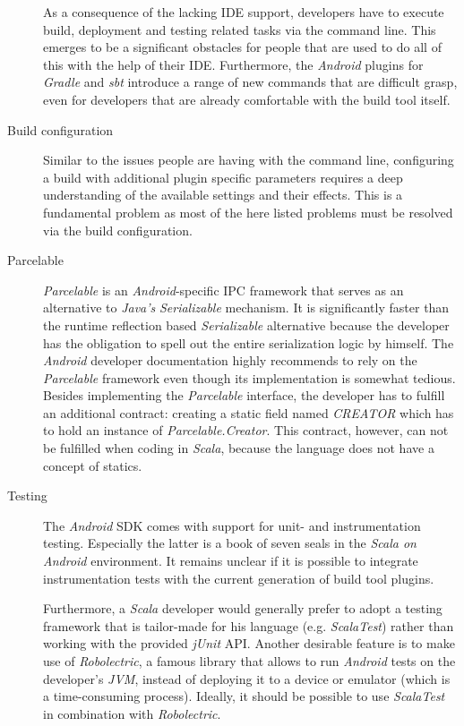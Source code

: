 \begin{description}
	As a consequence of the lacking \ac{IDE} support, developers have to execute build, deployment and testing related tasks via the command line. This emerges to be a significant obstacles for people that are used to do all of this with the help of their \ac{IDE}. Furthermore, the \textit{Android} plugins for \textit{Gradle} and \textit{sbt} introduce a range of new commands that are difficult grasp, even for developers that are already comfortable with the build tool itself.

	\item[Build configuration]\hfill

	Similar to the issues people are having with the command line, configuring a build with additional plugin specific parameters requires a deep understanding of the available settings and their effects. This is a fundamental problem as most of the here listed problems must be resolved via the build configuration.

	\item[Parcelable]\hfill

	\textit{Parcelable} is an \textit{Android}-specific \ac{IPC} framework that serves as an alternative to \textit{Java's} \textit{Serializable} mechanism. It is significantly faster than the runtime reflection based \textit{Serializable} alternative because the developer has the obligation to spell out the entire serialization logic by himself. The \textit{Android} developer documentation highly recommends to rely on the \textit{Parcelable} framework even though its implementation is somewhat tedious. Besides implementing the \textit{Parcelable} interface, the developer has to fulfill an additional contract: creating a static field named \textit{CREATOR} which has to hold an instance of \textit{Parcelable.Creator}. This contract, however, can not be fulfilled when coding in \textit{Scala}, because the language does not have a concept of statics.

	\item[Testing]\hfill

	The \textit{Android} \ac{SDK} comes with support for unit- and instrumentation testing. Especially the latter is a book of seven seals in the \textit{Scala on Android} environment. It remains unclear if it is possible to integrate instrumentation tests with the current generation of  build tool plugins.

	Furthermore, a \textit{Scala} developer would generally prefer to adopt a testing framework that is tailor-made for his language (e.g. \textit{ScalaTest}) rather than working with the provided \textit{jUnit} \ac{API}. Another desirable feature is to make use of \textit{Robolectric}, a famous library that allows to run \textit{Android} tests on the developer's \textit{JVM}, instead of deploying it to a device or emulator (which is a time-consuming process). Ideally, it should be possible to use \textit{ScalaTest} in combination with \textit{Robolectric}.


\end{description}
